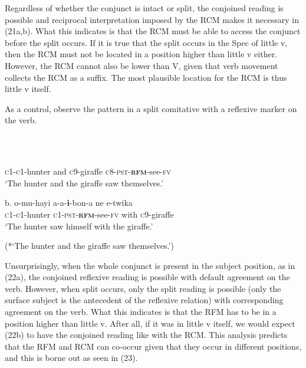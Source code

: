 \documentclass[output=paper]{langsci/langscibook}
\begin{document}
Regardless of whether the conjunct is intact or split, the conjoined reading is possible and reciprocal interpretation imposed by the RCM makes it necessary in (21a,b). What this indicates is that the RCM must be able to access the conjunct before the split occurs. If it is true that the split occurs in the Spec of little v, then the RCM must not be located in a position higher than little v either. However, the RCM cannot also be lower than V, given that verb movement collects the RCM as a suffix. The most plausible location for the RCM is thus little v itself. 

  As a control, observe the pattern in a split comitative with a reflexive marker on the verb. 

\begin{listWWviiiNumxlileveli}
\item \ea\label{ex:}
\\
\ea\label{ex:}
\\
\end{listWWviiiNumxlileveli}
       \textsc{c1-c1}{}-hunter   and   \textsc{c}9-giraffe   \textsc{c}8-\textsc{pst-}\textbf{\textsc{rfm}}{}-see-\textsc{fv} \\
\glt   ‘The hunter and the giraffe saw themselves.’
\z

\gll \textup{b.  }o-mu-hayi   a-a-\textbf{i}{}-bon-a     ne   e-twika \\
       \textsc{c1-c1}{}-hunter  \textsc{c}1-\textsc{pst-}\textbf{\textsc{rfm}}{}-see-\textsc{fv}   with   \textsc{c}9-giraffe \\
\glt   ‘The hunter saw himself with the giraffe.’
\z

\glt   (*‘The hunter and the giraffe saw themselves.’)
\z

Unsurprisingly, when the whole conjunct is present in the subject position, as in (22a), the conjoined reflexive reading is possible with default agreement on the verb. However, when split occurs, only the split reading is possible (only the surface subject is the antecedent of the reflexive relation) with corresponding agreement on the verb. What this indicates is that the RFM has to be in a position higher than little v. After all, if it was in little v itself, we would expect (22b) to have the conjoined reading like with the RCM. This analysis predicts that the RFM and RCM can co-occur given that they occur in different positions, and this is borne out as seen in (23).
\end{document}
